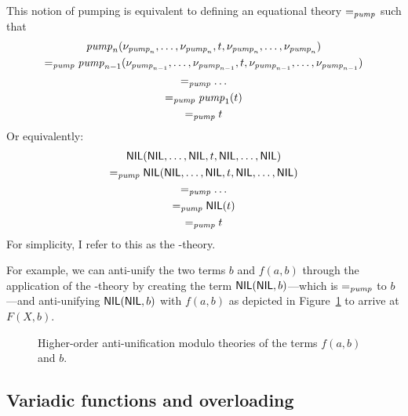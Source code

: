 This notion of pumping is equivalent to defining an equational theory $=_{\mathit{pump}}$ such that
\begin{gather*}
\mathit{pump}_n(\nu_{\mathit{pump}_n}, \ldots, \nu_{\mathit{pump}_n}, t, \nu_{\mathit{pump}_n}, \ldots, \nu_{\mathit{pump}_n})\\
=_{\mathit{pump}} \mathit{pump}_{n-1}(\nu_{\mathit{pump}_{n-1}}, \ldots, \nu_{\mathit{pump}_{n-1}}, t, \nu_{\mathit{pump}_{n-1}}, \ldots, \nu_{\mathit{pump}_{n-1}})\\
=_{\mathit{pump}} \ldots\\
=_{\mathit{pump}} \mathit{pump}_1(t)\\
=_{\mathit{pump}} t
\end{gather*}
Or equivalently:
\begin{gather*}
\textsf{NIL}(\textsf{NIL}, \ldots, \textsf{NIL}, t, \textsf{NIL}, \ldots, \textsf{NIL})\\
=_{\mathit{pump}} \textsf{NIL}(\textsf{NIL}, \ldots, \textsf{NIL}, t, \textsf{NIL}, \ldots, \textsf{NIL})\\
=_{\mathit{pump}} \ldots\\
=_{\mathit{pump}} \textsf{NIL}(t)\\
=_{\mathit{pump}} t
\end{gather*}
For simplicity, I refer to this as the \NIL{}-theory.

For example, we can anti-unify the two terms $b$ and $f(a,b)$ through the application of the \NIL{}-theory by creating the term $\textsf{NIL}(\textsf{NIL},b)$---which is $=_{\mathit{pump}}$ to $b$---and anti-unifying $\textsf{NIL}(\textsf{NIL},b)$ with $f(a,b)$ as depicted in Figure~\ref{fig:anti-nil} to arrive at $F(X, b)$.

\begin{figure}[t]
\centering{}
\caption{Higher-order anti-unification modulo theories of the terms $f(a, b)$ and $b$.\label{fig:anti-nil}}
\end{figure}

\subsection{Variadic functions and overloading}

